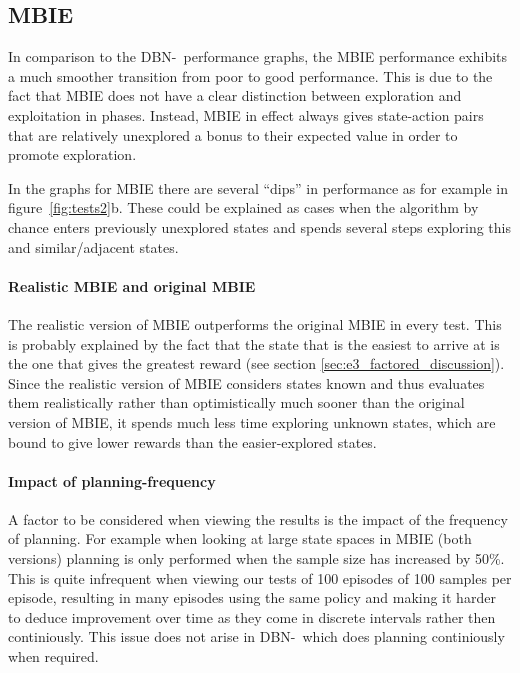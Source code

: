 \subsection{MBIE }
In comparison to the DBN-\etre\ performance graphs, the MBIE performance exhibits a much smoother transition from poor to good performance. This is due to the fact that MBIE does not have a clear distinction between exploration and exploitation in phases. Instead, MBIE in effect always gives state-action pairs that are relatively unexplored a bonus to their expected value in order to promote exploration.  

In the graphs for MBIE there are several ``dips'' in performance as for example in figure~\ref{fig:tests2}b. These could be explained as cases when the algorithm by chance enters previously unexplored states and spends several steps exploring this and similar/adjacent states. 

\paragraph{Realistic MBIE and original MBIE}
The realistic version of MBIE outperforms the original MBIE in every test. This is probably explained by the fact that the state that is the easiest to arrive at is the one that gives the greatest reward (see section \ref{sec:e3_factored_discussion}). Since the realistic version of MBIE considers states known and thus evaluates them  realistically rather than optimistically much sooner than the original version of MBIE, it spends much less time exploring unknown states, which are bound to give lower rewards than the easier-explored states. 

\paragraph{Impact of planning-frequency}
A factor to be considered when viewing the results is the impact of the frequency of planning. For example when looking at large state spaces in MBIE (both versions) planning is only performed when the sample size has increased by 50\%. This is quite infrequent when viewing our tests of 100 episodes of 100 samples per episode, resulting in many episodes using the same policy and making it harder to deduce improvement over time as they come in discrete intervals rather then continiously. This issue does not arise in DBN-\etre\ which does planning continiously when required.    


